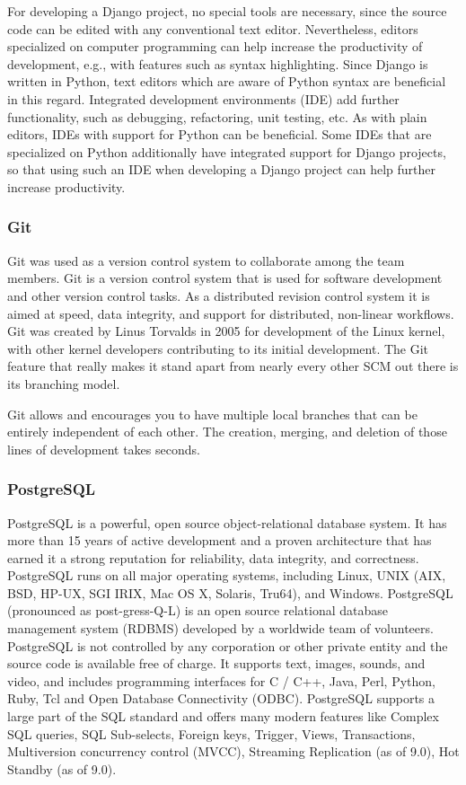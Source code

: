 For developing a Django project, no special tools are necessary, since the
source code can be edited with any conventional text editor. Nevertheless,
editors specialized on computer programming can help increase the productivity
of development, e.g., with features such as syntax highlighting. Since Django is
written in Python, text editors  which are aware of Python syntax are beneficial
in this regard. Integrated development environments (IDE) add further
functionality, such as debugging, refactoring, unit testing, etc. As with plain
editors, IDEs with support for Python can be beneficial. Some IDEs  that are
specialized on Python additionally have integrated support for Django projects,
so that using such an IDE when developing a Django project can help further
increase productivity.

\subsubsection{Git}
Git was used as a version control system to collaborate among the team members. Git is a version control system that is used for software development and other version control tasks. As a distributed revision control system it is aimed at speed, data integrity, and support for  distributed, non-linear workflows. Git was created by Linus Torvalds in 2005 for development of the Linux kernel, with other kernel developers contributing to its initial development. The Git feature that really makes it stand apart from nearly every other SCM out there is its branching model.

Git allows and encourages you to have multiple local branches that can be entirely independent of each other. The creation, merging, and deletion of those lines of development takes seconds.

\subsubsection{PostgreSQL}
PostgreSQL is a powerful, open source object-relational database system. It has more than 15 years of active development and a proven architecture that has earned it a strong reputation for reliability, data integrity, and correctness. PostgreSQL runs on all major operating systems, including Linux, UNIX (AIX, BSD, HP-UX, SGI IRIX, Mac OS X, Solaris, Tru64), and Windows. PostgreSQL (pronounced as post-gress-Q-L) is an open source relational database management system (RDBMS) developed by a worldwide team of volunteers. PostgreSQL is not controlled by any corporation or other private entity and the source code is available free of charge. It supports text, images, sounds, and video, and includes programming interfaces for C / C++, Java, Perl, Python, Ruby, Tcl and Open Database Connectivity (ODBC). PostgreSQL supports a large part of the SQL standard and offers many modern features like Complex SQL queries, SQL Sub-selects, Foreign keys, Trigger, Views, Transactions, Multiversion concurrency control (MVCC), Streaming Replication (as of 9.0), Hot Standby (as of 9.0).

